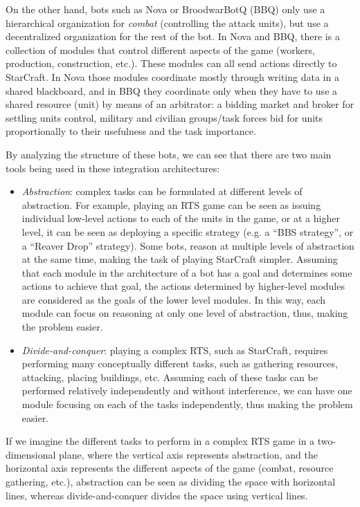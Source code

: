 \documentclass{llncs}
\begin{document}
On the other hand, bots such as Nova or BroodwarBotQ (BBQ) only use a hierarchical organization for {\em combat} (controlling the attack units), but use a decentralized organization for the rest of the bot. In Nova and BBQ, there is a collection of modules that control different aspects of the game (workers, production, construction, etc.). These modules can all send actions directly to StarCraft. In Nova those modules coordinate mostly through writing data in a shared blackboard, and in BBQ they coordinate only when they have to use a shared resource (unit) by means of an arbitrator: a bidding market and broker for settling units control, military and civilian groups/task forces bid for units proportionally to their usefulness and the task importance.

By analyzing the structure of these bots, we can see that there are two main tools being used in these integration architectures:

\begin{itemize}
\item {\em Abstraction}: complex tasks can be formulated at different levels of abstraction. For example, playing an RTS game can be seen as issuing individual low-level actions to each of the units in the game, or at a higher level, it can be seen as deploying a specific strategy (e.g. a ``BBS strategy'', or a ``Reaver Drop'' strategy). Some bots, reason at multiple levels of abstraction at the same time, making the task of playing StarCraft simpler. Assuming that each module in the architecture of a bot has a goal and determines some actions to achieve that goal, the actions determined by higher-level modules are considered as the goals of the lower level modules. In this way, each module can focus on reasoning at only one level of abstraction, thus, making the problem easier.

\item {\em Divide-and-conquer}: playing a complex RTS, such as StarCraft, requires performing many conceptually different tasks, such as gathering resources, attacking, placing buildings, etc. Assuming each of these tasks can be performed relatively independently and without interference, we can have one module focusing on each of the tasks independently, thus making the problem easier. 
\end{itemize}

If we imagine the different tasks to perform in a complex RTS game in a two-dimensional plane, where the vertical axis represents abstraction, and the horizontal axis represents the different aspects of the game (combat, resource gathering, etc.), abstraction can be seen as dividing the space with horizontal lines, whereas divide-and-conquer divides the space using vertical lines.
\end{document}
